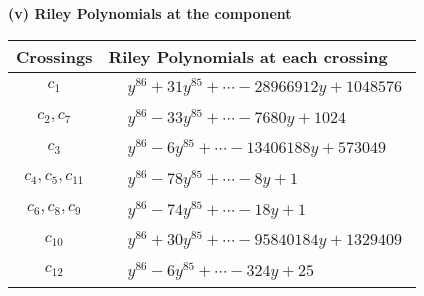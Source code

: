 \documentclass[1p]{elsarticle_modified}
\theoremstyle{definition}
\begin{document}
\newpage\renewcommand{\arraystretch}{1}
\flushleft \textbf{(v) Riley Polynomials at the component}\newline \\
\begin{tabular}{m{50pt}|m{274pt}}
Crossings & \hspace{64pt}Riley Polynomials at each crossing \\
\hline $$\begin{aligned}c_{1}\end{aligned}$$&$\begin{aligned}
&y^{86}+31 y^{85}+\cdots-28966912 y+1048576
\end{aligned}$\\
\hline $$\begin{aligned}c_{2},c_{7}\end{aligned}$$&$\begin{aligned}
&y^{86}-33 y^{85}+\cdots-7680 y+1024
\end{aligned}$\\
\hline $$\begin{aligned}c_{3}\end{aligned}$$&$\begin{aligned}
&y^{86}-6 y^{85}+\cdots-13406188 y+573049
\end{aligned}$\\
\hline $$\begin{aligned}c_{4},c_{5},c_{11}\end{aligned}$$&$\begin{aligned}
&y^{86}-78 y^{85}+\cdots-8 y+1
\end{aligned}$\\
\hline $$\begin{aligned}c_{6},c_{8},c_{9}\end{aligned}$$&$\begin{aligned}
&y^{86}-74 y^{85}+\cdots-18 y+1
\end{aligned}$\\
\hline $$\begin{aligned}c_{10}\end{aligned}$$&$\begin{aligned}
&y^{86}+30 y^{85}+\cdots-95840184 y+1329409
\end{aligned}$\\
\hline $$\begin{aligned}c_{12}\end{aligned}$$&$\begin{aligned}
&y^{86}-6 y^{85}+\cdots-324 y+25
\end{aligned}$\\
\hline
\end{tabular}\\~\\
\end{document}

